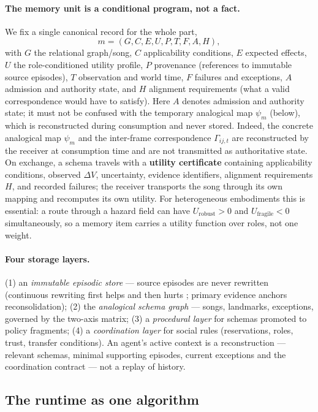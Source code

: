 \documentclass{article}
\begin{document}
\paragraph{The memory unit is a conditional program, not a fact.}
We fix a single canonical record for the whole part,
\[
m = (G, C, E, U, P, T, F, A, H),
\]
with $G$ the relational graph/song, $C$ applicability conditions, $E$
expected effects, $U$ the role-conditioned utility profile, $P$
provenance (references to immutable source episodes), $T$ observation
and world time, $F$ failures and exceptions, $A$ admission and
authority state, and $H$ alignment requirements (what a valid
correspondence would have to satisfy). Here $A$ denotes admission and
authority state; it must not be confused with the temporary analogical
map $\psi_m$ (below), which is reconstructed during consumption and
never stored. Indeed, the concrete analogical map $\psi_m$ and the
inter-frame correspondence $\Gamma_{ij,t}$ are reconstructed by the
receiver at consumption time and are not transmitted as authoritative
state. On exchange, a schema travels with a \textbf{utility
certificate} containing applicability conditions, observed $\Delta V$,
uncertainty, evidence identifiers, alignment requirements $H$, and
recorded failures; the
receiver transports the song through its own mapping and recomputes
its own utility. For heterogeneous embodiments this is essential: a
route through a hazard field can have $U_{\mathrm{robust}} > 0$ and
$U_{\mathrm{fragile}} < 0$ simultaneously, so a memory item carries a
utility function over roles, not one weight.

\paragraph{Four storage layers.} (1) an \emph{immutable episodic
store} --- source episodes are never rewritten (continuous rewriting
first helps and then hurts \citep{faulty2026}; primary evidence
anchors reconsolidation); (2) the \emph{analogical schema graph} ---
songs, landmarks, exceptions, governed by the two-axis matrix; (3) a
\emph{procedural layer} for schemas promoted to policy fragments;
(4) a \emph{coordination layer} for social rules (reservations,
roles, trust, transfer conditions). An agent's active context is a
reconstruction --- relevant schemas, minimal supporting episodes,
current exceptions and the coordination contract --- not a replay of
history.

\subsection{The runtime as one algorithm}
\label{p5:sec:algorithm}
\end{document}
